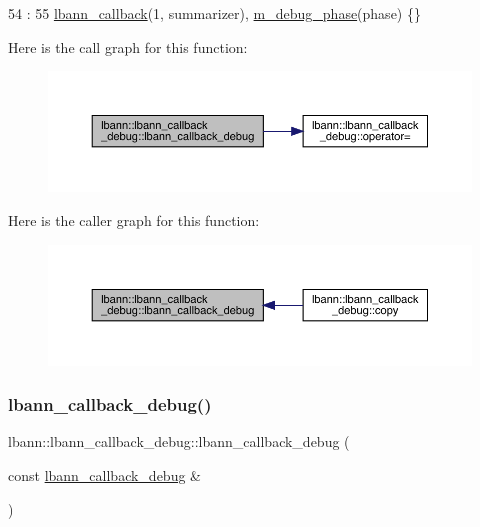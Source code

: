 \begin{DoxyCode}
54                                                             :
55     \hyperlink{classlbann_1_1lbann__callback_a679057298a41ddd47f08c157f756c584}{lbann\_callback}(1, summarizer), \hyperlink{classlbann_1_1lbann__callback__debug_acc66ab699534e42aa958148f1fb3fd6f}{m\_debug\_phase}(phase) \{\}
\end{DoxyCode}
Here is the call graph for this function\+:\nopagebreak
\begin{figure}[H]
\begin{center}
\leavevmode
\includegraphics[width=350pt]{classlbann_1_1lbann__callback__debug_a775f2f407573526795a9b7ffc7bd3ded_cgraph}
\end{center}
\end{figure}
Here is the caller graph for this function\+:\nopagebreak
\begin{figure}[H]
\begin{center}
\leavevmode
\includegraphics[width=350pt]{classlbann_1_1lbann__callback__debug_a775f2f407573526795a9b7ffc7bd3ded_icgraph}
\end{center}
\end{figure}
\mbox{\label{classlbann_1_1lbann__callback__debug_a124703602aab20bcfabfca697e3a9ff1}} 
\subsubsection{\texorpdfstring{lbann\+\_\+callback\+\_\+debug()}{lbann\_callback\_debug()}\hspace{0.1cm}{\footnotesize\ttfamily [2/2]}}
{\footnotesize\ttfamily lbann\+::lbann\+\_\+callback\+\_\+debug\+::lbann\+\_\+callback\+\_\+debug (\begin{DoxyParamCaption}\item[{const \hyperlink{classlbann_1_1lbann__callback__debug}{lbann\+\_\+callback\+\_\+debug} \&}]{ }\end{DoxyParamCaption})\hspace{0.3cm}{\ttfamily [default]}}



